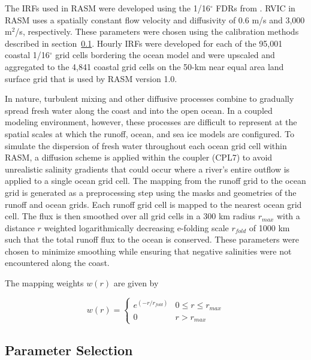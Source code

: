 \documentclass[jgrga, draft]{agutex}
\begin{document}
\begin{article}
The IRFs used in RASM were developed using the 1/16$^{\circ}$ FDRs from \citet{Wu_2011}.
RVIC in RASM uses a spatially constant flow velocity and diffusivity of 0.6 m/s and 3,000 m$^2$/s, respectively.
These parameters were chosen using the calibration methods described in section~\ref{sec:parameters}.
Hourly IRFs were developed for each of the 95,001 coastal 1/16$^{\circ}$ grid cells bordering the ocean model and were upscaled and aggregated to the 4,841 coastal grid cells on the 50-km near equal area land surface grid that is used by RASM version 1.0.

In nature, turbulent mixing and other diffusive processes combine to gradually spread fresh water along the coast and into the open ocean.
In a coupled modeling environment, however, these processes are difficult to represent at the spatial scales at which the runoff, ocean, and sea ice models are configured.
To simulate the dispersion of fresh water throughout each ocean grid cell within RASM, a diffusion scheme is applied within the coupler (CPL7) to avoid unrealistic salinity gradients that could occur where a river's entire outflow is applied to a single ocean grid cell.
The mapping from the runoff grid to the ocean grid is generated as a preprocessing step using the masks and geometries of the runoff and ocean grids.
Each runoff grid cell is mapped to the nearest ocean grid cell.
The flux is then smoothed over all grid cells in a 300 km radius $r_{max}$ with a distance $r$ weighted logarithmically decreasing e-folding scale $r_{fold}$ of 1000 km such that the total runoff flux to the ocean is conserved.
These parameters were chosen to minimize smoothing while ensuring that negative salinities were not encountered along the coast.

The mapping weights $w(r)$ are given by

\begin{equation}
  \label{eq:diffusion}
  w(r)=
     \begin{cases}
        e^{(-r/r_{fold})} & 0\leq r\leq r_{max} \\
        0 & r > r_{max}
     \end{cases}
\end{equation}

\subsection{Parameter Selection}
\label{sec:parameters}


\end{article}
\end{document}
